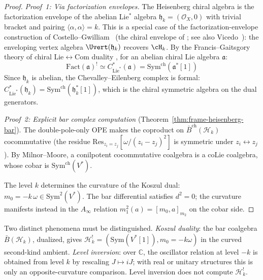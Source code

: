 \begin{proof}
\emph{Proof~1: Via factorization envelopes.}
The Heisenberg chiral algebra is the factorization envelope of the abelian Lie$^*$ algebra $\mathfrak{h}_k = (\mathcal{O}_X, 0)$ with trivial bracket and pairing $\langle \alpha, \alpha \rangle = k$. This is a special case of the factorization-envelope construction of Costello--Gwilliam~\cite{CG17} (the chiral envelope of \cite[\S3.7]{BD04}; see also Vicedo~\cite{Vic25}): the enveloping vertex algebra $\Uvert(\mathfrak{h}_k)$ recovers $\cH_k$. By the Francis--Gaitsgory theory of chiral Lie$\leftrightarrow$Com duality \cite{FG12}, for an abelian chiral Lie algebra $\mathfrak{a}$:
\[\mathrm{Fact}(\mathfrak{a})^! \simeq C^*_{\mathrm{Lie}^*}(\mathfrak{a}) = \mathrm{Sym}^{\mathrm{ch}}(\mathfrak{a}^*[1])\]
Since $\mathfrak{h}_k$ is abelian, the Chevalley--Eilenberg complex is formal: $C^*_{\mathrm{Lie}^*}(\mathfrak{h}_k) = \mathrm{Sym}^{\mathrm{ch}}(\mathfrak{h}_k^*[1])$, which is the chiral symmetric algebra on the dual generators.

\medskip
\emph{Proof~2: Explicit bar complex computation}
(Theorem~\ref{thm:frame-heisenberg-bar}).
The double-pole-only OPE makes the coproduct on $\bar{B}^{\mathrm{ch}}(\mathcal{H}_k)$ cocommutative (the residue $\mathrm{Res}_{z_i = z_j}[\omega/(z_i - z_j)^2]$ is symmetric under $z_i \leftrightarrow z_j$). By Milnor--Moore, a conilpotent cocommutative coalgebra is a coLie coalgebra, whose cobar is $\mathrm{Sym}^{\mathrm{ch}}(V^*)$.

The level $k$ determines the curvature of the Koszul dual:
$m_0 = -k\,\omega \in \mathrm{Sym}^2(V^*)$. The bar differential
satisfies $d^2 = 0$; the curvature manifests instead in the
$A_\infty$ relation $m_1^2(a) = [m_0, a]_{m_2}$ on the cobar side.
\end{proof}

\begin{remark}
Two distinct phenomena must be distinguished. \emph{Koszul duality}:
the bar coalgebra $\bar{B}(\mathcal{H}_k)$, dualized, gives
$\mathcal{H}_k^!=(\mathrm{Sym}(V^*[1]),m_0=-k\omega)$ in the
curved second-kind ambient.
\emph{Level inversion}: over $\mathbb C$, the oscillator relation at
level $-k$ is obtained from level $k$ by rescaling $J\mapsto iJ$;
with real or unitary structures this is only an opposite-curvature
comparison. Level inversion does not compute $\mathcal H_k^!$.
\end{remark}

